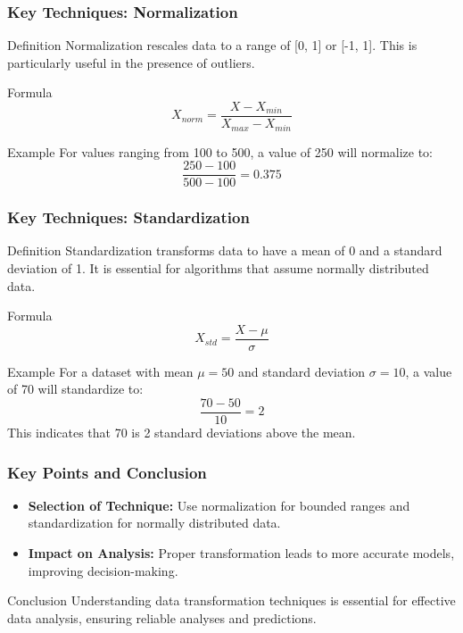 \documentclass[aspectratio=169]{beamer}
\begin{document}
\begin{frame}[fragile]
    \frametitle{Key Techniques: Normalization}
    \begin{block}{Definition}
        Normalization rescales data to a range of [0, 1] or [-1, 1]. This is particularly useful in the presence of outliers.
    \end{block}
    \begin{block}{Formula}
        \begin{equation}
        X_{norm} = \frac{X - X_{min}}{X_{max} - X_{min}}
        \end{equation}
    \end{block}
    \begin{block}{Example}
        For values ranging from 100 to 500, a value of 250 will normalize to:
        \begin{equation}
        \frac{250 - 100}{500 - 100} = 0.375
        \end{equation}
    \end{block}
\end{frame}

\begin{frame}[fragile]
    \frametitle{Key Techniques: Standardization}
    \begin{block}{Definition}
        Standardization transforms data to have a mean of 0 and a standard deviation of 1. It is essential for algorithms that assume normally distributed data.
    \end{block}
    \begin{block}{Formula}
        \begin{equation}
        X_{std} = \frac{X - \mu}{\sigma}
        \end{equation}
    \end{block}
    \begin{block}{Example}
        For a dataset with mean $\mu = 50$ and standard deviation $\sigma = 10$, a value of 70 will standardize to:
        \begin{equation}
        \frac{70 - 50}{10} = 2
        \end{equation}
        This indicates that 70 is 2 standard deviations above the mean.
    \end{block}
\end{frame}

\begin{frame}[fragile]
    \frametitle{Key Points and Conclusion}
    \begin{itemize}
        \item \textbf{Selection of Technique:} Use normalization for bounded ranges and standardization for normally distributed data.
        \item \textbf{Impact on Analysis:} Proper transformation leads to more accurate models, improving decision-making.
    \end{itemize}
    \begin{block}{Conclusion}
        Understanding data transformation techniques is essential for effective data analysis, ensuring reliable analyses and predictions.
    \end{block}
\end{frame}
\end{document}
